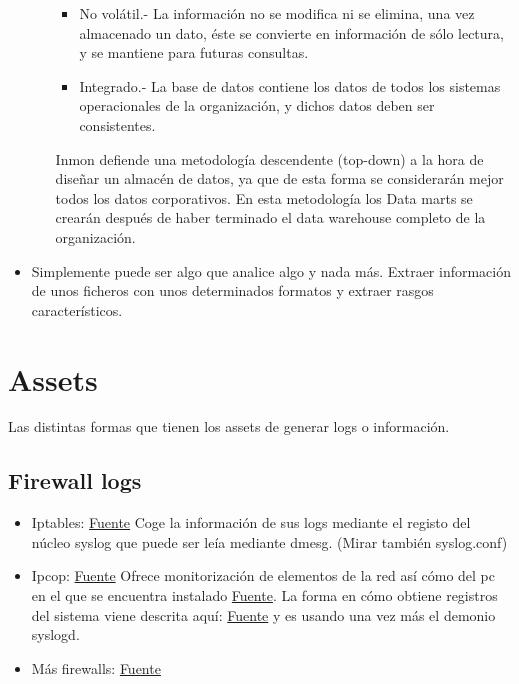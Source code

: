 \documentclass[a4paper,12pt]{article}
\begin{document}
\begin{itemize}
\begin{itemize}
\begin{itemize}
    \item No volátil.- La información no se modifica ni se elimina, una vez almacenado un dato, éste se convierte en información de sólo lectura, y se mantiene para futuras consultas.
    \item Integrado.- La base de datos contiene los datos de todos los sistemas operacionales de la organización, y dichos datos deben ser consistentes.
    \end{itemize}
Inmon defiende una metodología descendente (top-down) a la hora de diseñar un almacén de datos, ya que de esta forma se considerarán mejor todos los datos corporativos. En esta metodología los Data marts se crearán después de haber terminado el data warehouse completo de la organización.
  \end{itemize}
\item Simplemente puede ser algo que analice algo y nada más. Extraer información de unos ficheros con unos determinados formatos y extraer rasgos característicos.
\end{itemize}

\section{Assets}

Las distintas formas que tienen los assets de generar logs o información.

\subsection{Firewall logs}

\begin{itemize}
\item Iptables: \href{https://www.frozentux.net/iptables-tutorial/spanish/iptables-tutorial.html\#LOGTARGET}{Fuente} Coge la información de sus logs mediante el registo del núcleo syslog que puede ser leía mediante dmesg. (Mirar también syslog.conf)
\item Ipcop: \href{http://www.ipcop.org/}{Fuente} Ofrece monitorización de elementos de la red así cómo del pc en el que se encuentra instalado \href{http://www.ipcop.org/2.0.0/es/admin/html/status.html}{Fuente}. La forma en cómo obtiene registros del sistema viene descrita aquí: \href{http://www.ipcop.org/2.0.0/es/admin/html/logs.html}{Fuente} y es usando una vez más el demonio syslogd.
\item Más firewalls:  \href{http://www.tecmint.com/open-source-security-firewalls-for-linux-systems/}{Fuente}
\end{itemize}
\end{document}
